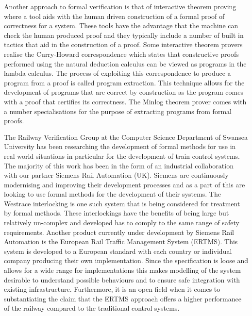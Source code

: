 Another approach to formal verification is that of interactive theorem proving \cite{HG09,SSD06} where a tool aids with the human driven construction of a formal proof of correctness for a system. These tools have the advantage that the machine can check the human produced proof and they typically include a number of built in tactics that aid in the construction of a proof. Some interactive theorem provers realise the Curry-Howard correspondence \cite{HC34, HC58, WH80} which states that constructive proofs performed using the natural deduction calculus can be viewed as programs in the lambda calculus.  The process of exploiting this correspondence to produce a program from a proof is called program extraction. This technique allows for the development of programs that are correct by construction as the program comes with a proof that certifies its correctness. The Minlog theorem prover comes with a number specialisations for the purpose of extracting programs from formal proofs.
\begin{comment}
\textbf{Note: Add something about program extraction here.}
Alternatively to automatic techniques for verification there are also interactive theorem provers which employ man-machine collaboration in order to prove properties over a system.
Program extraction is another verification technique which allows the production of correct by construction computer programs. It is based around the Curry-Howard correspondence \cite{} which states that constructive proofs performed using the natural deduction calculus can be viewed as programs in the lambda calculus. 
\end{comment}


The Railway Verification Group at the Computer Science Department of Swansea University has been researching the development of formal methods for use in real world situations in particular for the development of train control systems. The majority of this work has been in the form of an industrial collaboration with our partner Siemens Rail Automation (UK). Siemens are continuously modernising and improving their development processes and as a part of this are looking to use formal methods for the development of their systems. The Westrace interlocking is one such system that is being considered for treatment by formal methods. These interlockings have the benefits of being large but relatively un-complex and developed has to comply to the same range of safety requirements.  Another product currently under development by Siemens Rail Automation is the European Rail Traffic Management System (ERTMS). This system is developed to a European  standard with each country or individual company producing their own implementation. Since the specification is loose and allows for a wide range for implementations this makes modelling of the system desirable to understand possible behaviours and to ensure safe integration with existing infrastructure. Furthermore, it is an open field  when it comes to substantiating the claim that the ERTMS approach offers a higher performance of the railway compared to the traditional control systems.




